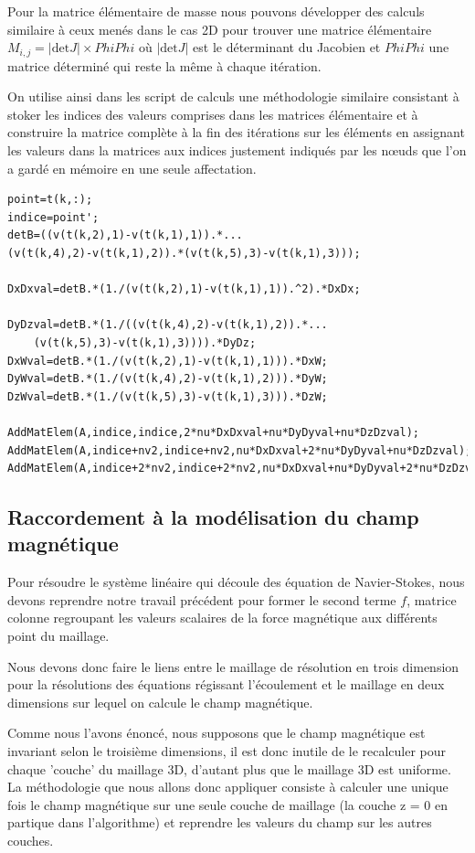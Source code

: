 \documentclass[a4paper,12pt,titlepage]{report}
\begin{document}
\begin{onehalfspace}
Pour la matrice élémentaire de masse nous pouvons développer des calculs similaire à ceux menés dans le cas 2D pour trouver une matrice élémentaire $M_{i, j} = |\text{det} J| \times PhiPhi$ où $|\text{det} J|$ est le déterminant du Jacobien et $PhiPhi$ une matrice déterminé qui reste la même à chaque itération.

On utilise ainsi dans les script de calculs une méthodologie similaire consistant à stoker les indices des valeurs comprises dans les matrices élémentaire et à construire la matrice complète à la fin des itérations sur les éléments en assignant les valeurs dans la matrices aux indices justement indiqués par les nœuds que l'on a gardé en mémoire en une seule affectation.

\begin{verbatim}
point=t(k,:);
indice=point';
detB=((v(t(k,2),1)-v(t(k,1),1)).*...
(v(t(k,4),2)-v(t(k,1),2)).*(v(t(k,5),3)-v(t(k,1),3)));
    
DxDxval=detB.*(1./(v(t(k,2),1)-v(t(k,1),1)).^2).*DxDx;
  
DyDzval=detB.*(1./((v(t(k,4),2)-v(t(k,1),2)).*...
    (v(t(k,5),3)-v(t(k,1),3)))).*DyDz;
DxWval=detB.*(1./(v(t(k,2),1)-v(t(k,1),1))).*DxW;
DyWval=detB.*(1./(v(t(k,4),2)-v(t(k,1),2))).*DyW;
DzWval=detB.*(1./(v(t(k,5),3)-v(t(k,1),3))).*DzW;
    
AddMatElem(A,indice,indice,2*nu*DxDxval+nu*DyDyval+nu*DzDzval);
AddMatElem(A,indice+nv2,indice+nv2,nu*DxDxval+2*nu*DyDyval+nu*DzDzval);
AddMatElem(A,indice+2*nv2,indice+2*nv2,nu*DxDxval+nu*DyDyval+2*nu*DzDzval);
\end{verbatim}
\subsection{Raccordement à la modélisation du champ magnétique}

Pour résoudre le système linéaire qui découle des équation de Navier-Stokes, nous devons reprendre notre travail précédent pour former le second terme $f$, matrice colonne regroupant les valeurs scalaires de la force magnétique aux différents point du maillage.

Nous devons donc faire le liens entre le maillage de résolution en trois dimension pour la résolutions des équations régissant l'écoulement et le maillage en deux dimensions sur lequel on calcule le champ magnétique. 

Comme nous l'avons énoncé, nous supposons que le champ magnétique est invariant selon le troisième dimensions, il est donc inutile de le recalculer pour chaque 'couche' du maillage 3D, d'autant plus que le maillage 3D est uniforme. 
La méthodologie que nous allons donc appliquer consiste à calculer une unique fois le champ magnétique sur une seule couche de maillage (la couche z = 0 en partique dans l'algorithme) et reprendre les valeurs du champ sur les autres couches.


\end{onehalfspace}
\end{document}
